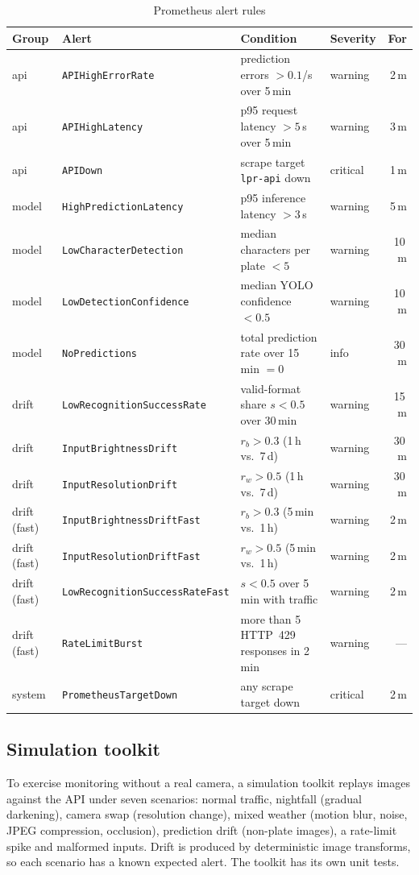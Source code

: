 \documentclass[conference]{IEEEtran}
\newcommand{\code}[1]{\texttt{#1}}
\begin{document}
\begin{table}[t]
\centering
\caption{Prometheus alert rules}
\label{tab:alerts}
\setlength{\tabcolsep}{4pt}
\footnotesize
\begin{tabular}{@{}llL{8.2cm}lr@{}}
\toprule
Group & Alert & Condition & Severity & For \\
\midrule
api & \code{APIHighErrorRate} & prediction errors $>0.1$/s over 5\,min & warning & 2\,m \\
api & \code{APIHighLatency} & p95 request latency $>5$\,s over 5\,min & warning & 3\,m \\
api & \code{APIDown} & scrape target \code{lpr-api} down & critical & 1\,m \\
model & \code{HighPredictionLatency} & p95 inference latency $>3$\,s & warning & 5\,m \\
model & \code{LowCharacterDetection} & median characters per plate $<5$ & warning & 10\,m \\
model & \code{LowDetectionConfidence} & median YOLO confidence $<0.5$ & warning & 10\,m \\
model & \code{NoPredictions} & total prediction rate over 15\,min $=0$ & info & 30\,m \\
drift & \code{LowRecognitionSuccessRate} & valid-format share $s<0.5$ over 30\,min & warning & 15\,m \\
drift & \code{InputBrightnessDrift} & $r_b>0.3$ (1\,h vs.\ 7\,d) & warning & 30\,m \\
drift & \code{InputResolutionDrift} & $r_w>0.5$ (1\,h vs.\ 7\,d) & warning & 30\,m \\
drift (fast) & \code{InputBrightnessDriftFast} & $r_b>0.3$ (5\,min vs.\ 1\,h) & warning & 2\,m \\
drift (fast) & \code{InputResolutionDriftFast} & $r_w>0.5$ (5\,min vs.\ 1\,h) & warning & 2\,m \\
drift (fast) & \code{LowRecognitionSuccessRateFast} & $s<0.5$ over 5\,min with traffic & warning & 2\,m \\
drift (fast) & \code{RateLimitBurst} & more than 5 HTTP~429 responses in 2\,min & warning & --- \\
system & \code{PrometheusTargetDown} & any scrape target down & critical & 2\,m \\
\bottomrule
\end{tabular}
\end{table}

\subsection{Simulation toolkit}
To exercise monitoring without a real camera, a simulation toolkit replays images
against the API under seven scenarios: normal traffic, nightfall (gradual
darkening), camera swap (resolution change), mixed weather (motion blur, noise, JPEG compression, occlusion),
prediction drift (non-plate images), a rate-limit spike and malformed inputs.
Drift is produced by deterministic image transforms, so each scenario has a known
expected alert. The toolkit has its own unit tests.
\end{document}
